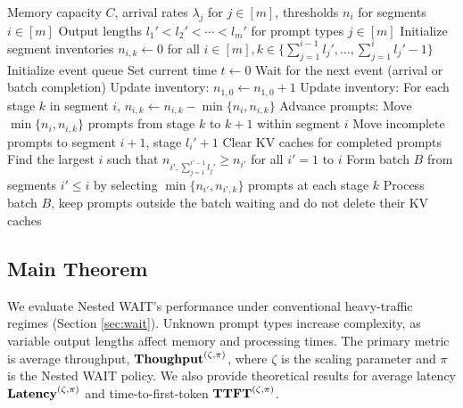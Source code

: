 \begin{algorithm}[h]
\caption{Nested WAIT: Nested Waiting for Accumulated Inference Threshold}
\label{alg:nested_wait}
{\small\linespread{1.0}\selectfont
\begin{algorithmic}[1]
\Require Memory capacity \( C \), arrival rates \( \lambda_j \) for \( j \in [m] \), thresholds \( n_i \) for segments \( i \in [m] \)
\Require Output lengths \( l_1' < l_2' < \cdots < l_m' \) for prompt types \( j \in [m] \)
\State Initialize segment inventories \( n_{i,k} \gets 0 \) for all \( i \in [m], k \in \{\sum_{j=1}^{i-1} l_j', \dots, \sum_{j=1}^{i} l_j' - 1\} \)
\State Initialize event queue
\State Set current time \( t \gets 0 \)
    \State Wait for the next event (arrival or batch completion)
        \State Update inventory: \( n_{1,0} \gets n_{1,0} + 1 \)  
        \State Update inventory: For each stage \( k \) in segment \( i \), \( n_{i,k} \gets n_{i,k} - \min\{n_i, n_{i,k}\} \)
        \State Advance prompts: Move \( \min\{n_i, n_{i,k}\} \) prompts from stage \( k \) to \( k+1 \) within segment \( i \)
                \State Move incomplete prompts to segment \( i+1 \), stage \( l_i' + 1 \) 
            \Else
                \State Clear KV caches for completed prompts
            \EndIf
        \EndIf
    \EndIf
    \State Find the largest \( i \) such that \( n_{i', \sum_{j=1}^{i'-1} l_j'} \geq n_{i'} \) for all \( i' = 1 \) to \( i \)
        \State Form batch \( B \) from segments \( i' \leq i \) by selecting \( \min\{n_{i'}, n_{i',k}\} \) prompts at each stage \( k \)
        \State Process batch \( B \), keep prompts outside the batch waiting and do not delete their KV caches
    \EndIf
\EndWhile
\end{algorithmic}
}
\end{algorithm}

\subsection{Main Theorem}
\label{subsec:nested_main_theorem}

We evaluate Nested WAIT’s performance under conventional heavy-traffic regimes (Section \ref{sec:wait}). Unknown prompt types increase complexity, as variable output lengths affect memory and processing times. The primary metric is average throughput, \( \textbf{Thoughput}^{(\zeta, \pi)} \), where \( \zeta \) is the scaling parameter and \( \pi \) is the Nested WAIT policy. We also provide theoretical results for average latency \( \textbf{Latency}^{(\zeta, \pi)} \) and time-to-first-token \( \textbf{TTFT}^{(\zeta, \pi)} \).


